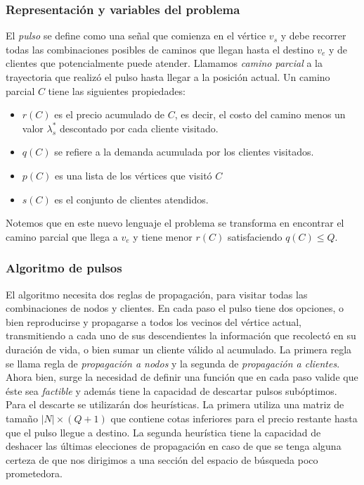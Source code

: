 \subsubsection{Representación y variables del problema}

El \emph{pulso} se define como una señal que comienza en el vértice $v_s$ y debe recorrer todas las combinaciones posibles de caminos que llegan hasta el destino $v_e$ y de clientes que potencialmente puede atender. Llamamos \emph{camino parcial} a la trayectoria que realizó el pulso hasta llegar a la posición actual. Un camino parcial $C$ tiene las siguientes propiedades:

\begin{itemize}
    \item $r(C)$ es el precio acumulado de $C$, es decir, el costo del camino menos un valor $\lambda^{*}_s$ descontado por cada cliente visitado.
    \item $q(C)$ se refiere a la demanda acumulada por los clientes visitados.
    \item $p(C)$ es una lista de los vértices que visitó $C$
    \item $s(C)$ es el conjunto de clientes atendidos.
\end{itemize}

Notemos que en este nuevo lenguaje el problema se transforma en encontrar el camino parcial que llega a $v_e$ y tiene menor $r(C)$ satisfaciendo $q(C) \leq Q$.


\subsubsection{Algoritmo de pulsos}

El algoritmo necesita dos reglas de propagación, para visitar todas las combinaciones de nodos y clientes. En cada paso el pulso tiene dos opciones, o bien reproducirse y propagarse a todos los vecinos del vértice actual, transmitiendo a cada uno de sus descendientes la información que recolectó en su duración de vida, o bien sumar un cliente válido al acumulado. La primera regla se llama regla de \emph{propagación a nodos} y la segunda de \emph{propagación a clientes}. Ahora bien, surge la necesidad de definir una función que en cada paso valide que éste sea \emph{factible} y además tiene la capacidad de descartar pulsos subóptimos. Para el descarte se utilizarán dos heurísticas. La primera utiliza una matriz de tamaño $|N| \times (Q+1)$ que contiene cotas inferiores para el precio restante hasta que el pulso llegue a destino. La segunda heurística tiene la capacidad de deshacer las últimas elecciones de propagación en caso de que se tenga alguna certeza de que nos dirigimos a una sección del espacio de búsqueda poco prometedora.  


